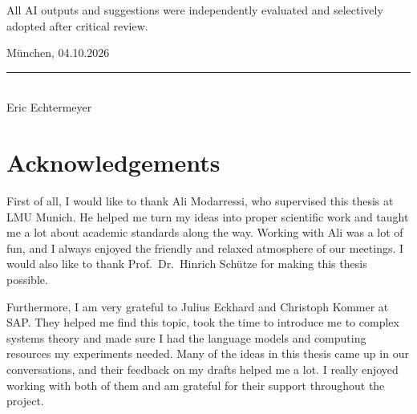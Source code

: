 \documentclass[12pt]{article}
\newcommand{\myname}{Eric Echtermeyer}
\begin{document}
All AI outputs and suggestions were independently evaluated and selectively adopted after critical review.

\vspace{0.8cm}
München, 04.10.2026 \\

\vspace{1cm}

\noindent\rule{0.5\textwidth}{0.4pt} \\

\myname

\newpage

\section*{Acknowledgements}

First of all, I would like to thank Ali Modarressi, who supervised this thesis at LMU
Munich. He helped me turn my ideas into proper scientific work and taught me a lot
about academic standards along the way. Working with Ali was a lot of fun, and I
always enjoyed the friendly and relaxed atmosphere of our meetings. I would also like
to thank Prof.\ Dr.\ Hinrich Schütze for making this thesis possible.

Furthermore, I am very grateful to Julius Eckhard and Christoph Kommer at SAP. They
helped me find this topic, took the time to introduce me to complex systems theory and
made sure I had the language models and computing resources my experiments needed.
Many of the ideas in this thesis came up in our conversations, and their feedback on
my drafts helped me a lot. I really enjoyed working with both of them and am grateful
for their support throughout the project.

\newpage
\end{document}
